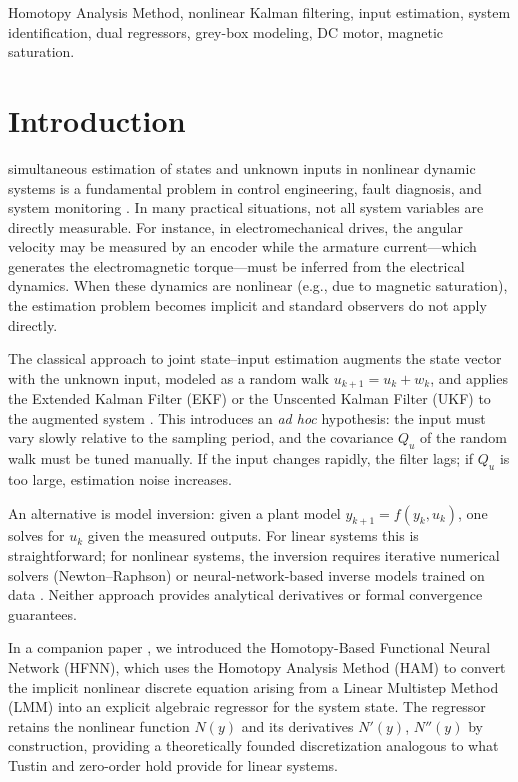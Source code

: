 \documentclass[lettersize,journal]{IEEEtran}
\begin{document}
\begin{IEEEkeywords}
Homotopy Analysis Method, nonlinear Kalman filtering, input estimation, system identification, dual regressors, grey-box modeling, DC motor, magnetic saturation.
\end{IEEEkeywords}

\section{Introduction}

 simultaneous estimation of states and unknown inputs in nonlinear dynamic systems is a fundamental problem in control engineering, fault diagnosis, and system monitoring \cite{gillijns2007}. In many practical situations, not all system variables are directly measurable. For instance, in electromechanical drives, the angular velocity may be measured by an encoder while the armature current---which generates the electromagnetic torque---must be inferred from the electrical dynamics. When these dynamics are nonlinear (e.g., due to magnetic saturation), the estimation problem becomes implicit and standard observers do not apply directly.

The classical approach to joint state--input estimation augments the state vector with the unknown input, modeled as a random walk $u_{k+1} = u_k + w_k$, and applies the Extended Kalman Filter (EKF) or the Unscented Kalman Filter (UKF) to the augmented system \cite{kitanidis1987, gillijns2007}. This introduces an \emph{ad hoc} hypothesis: the input must vary slowly relative to the sampling period, and the covariance $Q_u$ of the random walk must be tuned manually. If the input changes rapidly, the filter lags; if $Q_u$ is too large, estimation noise increases.

An alternative is model inversion: given a plant model $y_{k+1} = f(y_k, u_k)$, one solves for $u_k$ given the measured outputs. For linear systems this is straightforward; for nonlinear systems, the inversion requires iterative numerical solvers (Newton--Raphson) or neural-network-based inverse models trained on data \cite{hunt1996}. Neither approach provides analytical derivatives or formal convergence guarantees.

In a companion paper \cite{rodrigo2025hfnn}, we introduced the Homotopy-Based Functional Neural Network (HFNN), which uses the Homotopy Analysis Method (HAM) \cite{liao2003, liao2012} to convert the implicit nonlinear discrete equation arising from a Linear Multistep Method (LMM) into an explicit algebraic regressor for the system state. The regressor retains the nonlinear function $N(y)$ and its derivatives $N'(y)$, $N''(y)$ by construction, providing a theoretically founded discretization analogous to what Tustin and zero-order hold provide for linear systems.
\end{document}
